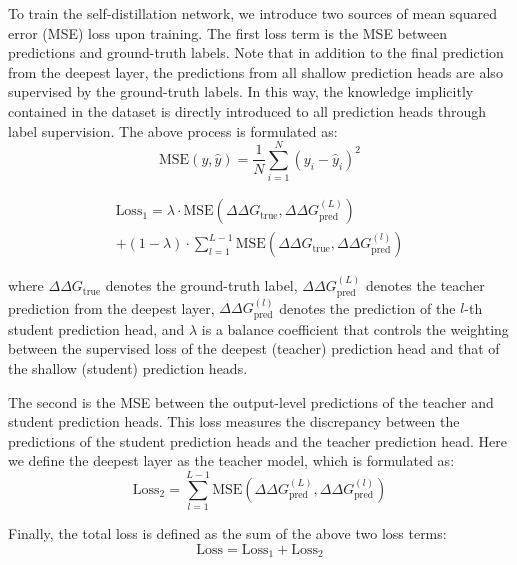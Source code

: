 \documentclass[journal,twoside,web]{ieeecolor}
\begin{document}
To train the self-distillation network, we introduce two sources of mean squared error (MSE) loss upon training. The first loss term is the MSE between predictions and ground-truth labels. Note that in addition to the final prediction from the deepest layer, the predictions from all shallow prediction heads are also supervised by the ground-truth labels. In this way, the knowledge implicitly contained in the dataset is directly introduced to all prediction heads through label supervision. The above process is formulated as:
\begin{equation}
\text{MSE}(y,\widehat{y}) = \frac{1}{N}\sum_{i = 1}^{N}(y_{i} - {\widehat{y}}_{i})^{2}
\label{eq:mse}
\end{equation}

\begin{multline}
\text{Loss}_{1} = \lambda \cdot \text{MSE}\left( \Delta\Delta G_{\text{true}},\Delta\Delta G_{\text{pred}}^{(L)} \right) \\
+ (1 - \lambda) \cdot \sum_{l = 1}^{L - 1}{\text{MSE}}\left( \Delta\Delta G_{\text{true}},\Delta\Delta G_{\text{pred}}^{(l)} \right)
\label{eq:loss1}
\end{multline}

where $\Delta\Delta G_{\text{true}}$ denotes the ground-truth label, $\Delta\Delta G_{\text{pred}}^{(L)}$ denotes the teacher prediction from the deepest layer, $\Delta\Delta G_{\text{pred}}^{(l)}$ denotes the prediction of the $l$-th student prediction head, and $\lambda$ is a balance coefficient that controls the weighting between the supervised loss of the deepest (teacher) prediction head and that of the shallow (student) prediction heads.

The second is the MSE between the output-level predictions of the teacher and student prediction heads. This loss measures the discrepancy between the predictions of the student prediction heads and the teacher prediction head. Here we define the deepest layer as the teacher model, which is formulated as:
\begin{equation}
\text{Loss}_{2} = \sum_{l = 1}^{L - 1}{\text{MSE}}\left( \Delta\Delta G_{\text{pred}}^{(L)},\Delta\Delta G_{\text{pred}}^{(l)} \right)
\label{eq:loss2}
\end{equation}

Finally, the total loss is defined as the sum of the above two loss terms:
\begin{equation}
\text{Loss} = \text{Loss}_{1} + \text{Loss}_{2}
\label{eq:total_loss}
\end{equation}
\end{document}
